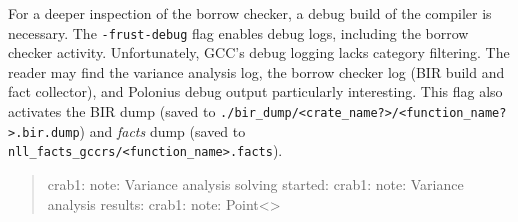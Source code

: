 \documentclass[
  11pt,
  twoside,symmetric]{report}
\newenvironment{Shaded}{}{}
\newcommand{\NormalTok}[1]{#1}
\begin{document}
For a deeper inspection of the borrow checker, a debug build of the
compiler is necessary. The \texttt{-frust-debug} flag enables debug
logs, including the borrow checker activity. Unfortunately, GCC's debug
logging lacks category filtering. The reader may find the variance
analysis log, the borrow checker log (BIR build and fact collector), and
Polonius debug output particularly interesting. This flag also activates
the BIR dump (saved to
\texttt{./bir\_dump/\textless{}crate\_name?\textgreater{}/\textless{}function\_name?\textgreater{}.bir.dump})
and \emph{facts} dump (saved to
\texttt{nll\_facts\_gccrs/\textless{}function\_name\textgreater{}.facts}).

\begin{quote}
\begin{Shaded}
\begin{Highlighting}[]
\NormalTok{crab1: note: Variance analysis solving started:}
\NormalTok{crab1: note: Variance analysis results:}
\NormalTok{crab1: note:  Point\textless{}\textgreater{}}
\end{Highlighting}
\end{Shaded}
\end{quote}
\end{document}
